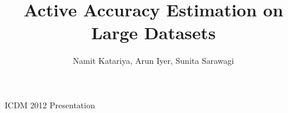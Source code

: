 \documentclass[11pt]{beamer}
\title[]{Active Accuracy Estimation on Large Datasets}
\author {Namit Katariya, Arun Iyer, Sunita Sarawagi}
\begin{document}
\begin{frame}
\titlepage
\begin{center}
\large{ICDM 2012 Presentation} \\ \vspace*{10pt}
\end{center}
\end{frame}



\end{document}
